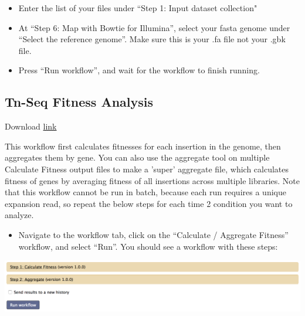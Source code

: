 \documentclass{article}
\begin{document}
\vspace{5 mm}

\begin{itemize}

\item Enter the list of your files under “Step 1: Input dataset collection" 
\item At “Step 6: Map with Bowtie for Illumina”, select your fasta genome under “Select the reference genome”. Make sure this is your .fa file not your .gbk file.
\item Press “Run workflow”, and wait for the workflow to finish running.

\end{itemize}

\newpage

\subsection{Tn-Seq Fitness Analysis}
\label{subsec:fitness}

Download \href{https://github.com/vanOpijnenLab/magenta-p2/blob/master/workflows/Calculate%20Fitnesses%20:%20Aggregate%20Fitnesses.ga}{link}

\vspace{2 mm}
\noindent
This workflow first calculates fitnesses for each insertion in the genome, then aggregates them by gene. You can also use the aggregate tool on multiple Calculate Fitness output files to make a 'super' aggregate file, which calculates fitness of genes by averaging fitness of all insertions across multiple libraries. Note that this workflow cannot be run in batch, because each run requires a unique expansion read, so repeat the below steps for each time 2 condition you want to analyze.

\begin{itemize}

\item Navigate to the workflow tab, click on the “Calculate / Aggregate Fitness” workflow, and select “Run”. You should see a workflow with these steps:

\end{itemize}

\vspace{5 mm}

\noindent
\includegraphics[scale=0.5]{CalcAgg.png}
\end{document}
